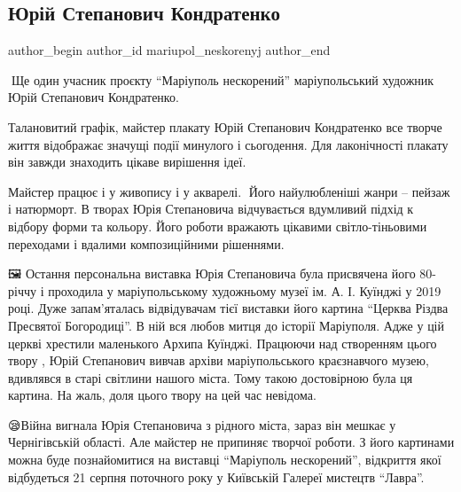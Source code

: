  
 
 
 
 

\subsection{Юрій Степанович Кондратенко}
\label{sec:17_08_2023.fb.mariupol_neskorenyj.1.jurij_stepanovych_kondratenko}

\ifcmt
 author_begin
   author_id mariupol_neskorenyj
 author_end
\fi

📍Ще один учасник проєкту  \enquote{Маріуполь нескорений}  маріупольський
художник Юрій Степанович Кондратенко. 

Талановитий графік, майстер плакату Юрій Степанович Кондратенко все творче
життя відображає значущі події минулого і сьогодення.  Для лаконічності плакату
він завжди знаходить цікаве вирішення ідеї.

Майстер працює і у живопису і у акварелі.🎨 Його найулюбленіші жанри – пейзаж і
натюрморт. В творах Юрія Степановича відчувається вдумливий підхід к відбору
форми та кольору. Його роботи вражають цікавими світло-тіньовими переходами і
вдалими композиційними рішеннями.

🖼 Остання персональна виставка Юрія Степановича була присвячена його 80-річчу
і проходила у маріупольському художньому музеї ім. А. І. Куїнджі у 2019 році.
Дуже запам'яталась відвідувачам тієї виставки його картина \enquote{Церква  Різдва
Пресвятої Богородиці}.  В ній вся любов митця до історії Маріуполя. Адже у цій
церкві хрестили маленького Архипа Куїнджі. Працюючи над створенням цього твору
, Юрій Степанович вивчав  архіви маріупольського краєзнавчого музею, вдивлявся
в старі світлини нашого міста. Тому такою достовірною була ця картина.  На
жаль, доля цього твору на цей час невідома.

😪Війна вигнала  Юрія Степановича з рідного міста, зараз він мешкає у
Чернігівській області. Але майстер не припиняє творчої роботи. З його картинами
можна буде познайомитися на виставці \enquote{Маріуполь нескорений}, відкриття якої
відбудеться 21 серпня  поточного року у Київській Галереї мистецтв \enquote{Лавра}.


